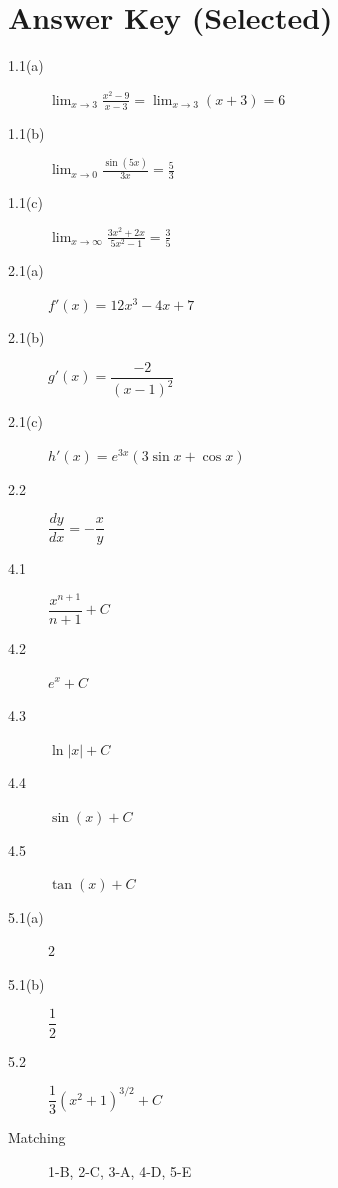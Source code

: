 \documentclass[
    language=english,
    doctype=workbook,
    institution=none,
]{../../omnilatex}
\begin{document}
\section{Answer Key (Selected)}

\begin{description}
    \item[1.1(a)] $\displaystyle\lim_{x \to 3} \frac{x^{2}-9}{x-3} = \lim_{x \to 3} (x+3) = 6$
    \item[1.1(b)] $\displaystyle\lim_{x \to 0} \frac{\sin(5x)}{3x} = \frac{5}{3}$
    \item[1.1(c)] $\displaystyle\lim_{x \to \infty} \frac{3x^{2}+2x}{5x^{2}-1} = \frac{3}{5}$
    \item[2.1(a)] $f'(x) = 12x^{3} - 4x + 7$
    \item[2.1(b)] $g'(x) = \dfrac{-2}{(x-1)^{2}}$
    \item[2.1(c)] $h'(x) = e^{3x}(3\sin x + \cos x)$
    \item[2.2] $\dfrac{dy}{dx} = -\dfrac{x}{y}$
    \item[4.1] $\dfrac{x^{n+1}}{n+1} + C$
    \item[4.2] $e^{x} + C$
    \item[4.3] $\ln|x| + C$
    \item[4.4] $\sin(x) + C$
    \item[4.5] $\tan(x) + C$
    \item[5.1(a)] $2$
    \item[5.1(b)] $\dfrac{1}{2}$
    \item[5.2] $\dfrac{1}{3}(x^{2}+1)^{3/2} + C$
    \item[Matching] 1-B, 2-C, 3-A, 4-D, 5-E
\end{description}
\end{document}
